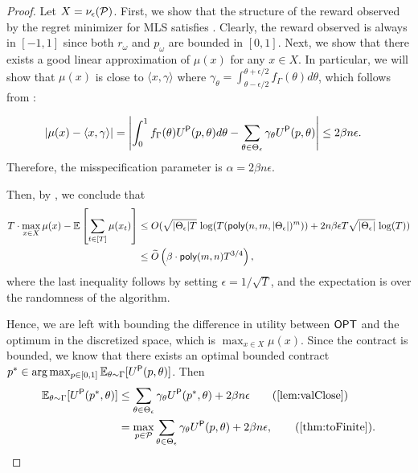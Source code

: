 \begin{proof}
	Let $X=\nu_\epsilon(\mathcal{P})$. First, we show that the structure of the reward observed by the regret minimizer for MLS satisfies .
	Clearly, the reward observed is always in $[-1,1]$ since both $r_\omega$ and $p_\omega$ are bounded in $[0,1]$. Next, we show that there exists a good linear approximation of $\mu(x)$ for any $x\in X$. In particular, we will show that $\mu(x)$ is close to $\langle x, \gamma\rangle$ where $\gamma_{\theta}=\int_{\theta-\epsilon/2}^{\theta+\epsilon/2} f_\Gamma(\theta)d\theta$, which follows from :
    
    \begin{align*}
        |\mu(x)-\langle x,\gamma\rangle|&=\left|\int_{0}^1f_\Gamma(\theta)U^\textsf{P}(p,\theta)d\theta-\sum_{\theta\in\Theta_\epsilon}\gamma_\theta U^\textsf{P}(p,\theta)\right|\le 2\beta n\epsilon.
    \end{align*}
    Therefore, the misspecification parameter is $\alpha=2\beta n\epsilon$.
	

	Then, by , we conclude that
	\begin{align*}
		 T\cdot \max_{x\in X} \mu(x)- \mathbb{E}\left[ \sum_{t\in [T]}  \mu(x_t)\right]& \le O(\sqrt{|\Theta_\epsilon|T}\,\log(T (\textsf{poly}(n,m,|\Theta_\epsilon|)^m))+ 2n\beta\epsilon T \sqrt{|\Theta_\epsilon|}\, \log(T))\\
		 & \le  \widetilde O\left(\beta\cdot \textsf{poly}(m,n) T^{3/4}\right),
	\end{align*}
	where the last inequality follows by setting $\epsilon=1/\sqrt{T}$,  and the expectation is over the randomness of the algorithm.
	
	
	Hence, we are left with bounding the difference in utility between $\textsf{OPT}$ and the optimum in the discretized space, which is $\max_{x \in X} \mu(x)$.
        Since the contract is bounded, we know that there exists an optimal bounded contract $p^*\in \arg \max_{p \in [0,1]} \mathbb{E}_{\theta\sim \Gamma}[U^\textsf{P}(p,\theta)]$.
	Then
	\begin{align*}
		\mathbb{E}_{\theta\sim \Gamma}[\Up(p^*,\theta)]&
        \le \sum_{\theta \in \Theta_\epsilon}  \gamma_\theta  \Up(p^*,\theta)  + 2\beta n \epsilon\tag{\Cref{lem:valClose}}\\
		& = \max_{p \in \Pcal} \sum_{\theta \in \Theta_\epsilon}  \gamma_\theta  \Up(p,\theta)  + 2\beta n \epsilon,\tag{\Cref{thm:toFinite}}.
	\end{align*}
	

\end{proof}
